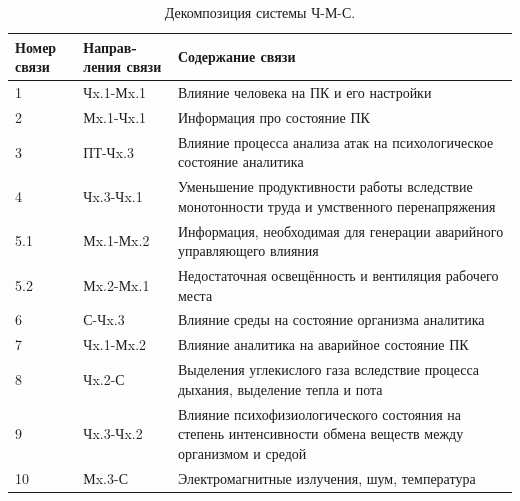 \begin{table}
    \caption{Декомпозиция системы Ч-М-С.}
    \label{table:worker_safety_HME}
    \def\arraystretch{1.25}
    \begin{tabular}{| m{1.3cm} | m{2.3cm} | m{11.7cm} |}
        \hline
        Номер связи & Направ- ления связи   & Содержание связи                                                                                          \\ \hline
        1           & Чx.1-Мx.1             & Влияние человека на ПК и его настройки                                                                    \\ \hline
        2           & Мx.1-Чx.1             & Информация про состояние ПК                                                                               \\ \hline
        3           & ПТ-Чx.3               & Влияние процесса анализа атак на психологическое состояние аналитика                                      \\ \hline
        4           & Чx.3-Чx.1             & Уменьшение продуктивности работы вследствие монотонности труда и умственного перенапряжения               \\ \hline
        5.1         & Мx.1-Мx.2             & Информация, необходимая для генерации аварийного управляющего влияния                                     \\ \hline
        5.2         & Мx.2-Мx.1             & Недостаточная освещённость и вентиляция рабочего места                                                    \\ \hline
        6           & С-Чx.3                & Влияние среды на состояние организма аналитика                                                            \\ \hline
        7           & Чx.1-Мx.2             & Влияние аналитика на аварийное состояние ПК                                                               \\ \hline
        8           & Чx.2-С                & Выделения углекислого газа вследствие процесса дыхания, выделение тепла и пота                            \\ \hline
        9           & Чx.3-Чx.2             & Влияние психофизиологического состояния на степень интенсивности обмена веществ между организмом и средой \\ \hline
        10          & Мx.3-С                & Электромагнитные излучения, шум, температура                                                              \\ \hline

\end{tabular}
\end{table}
